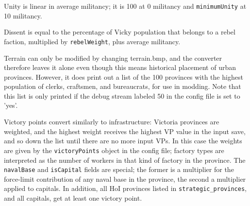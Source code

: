 \documentclass[12pt,ebook,oneside]{book}
\begin{document}
Unity is linear in average militancy; it is 100 at 0 militancy and
\texttt{minimumUnity} at 10 militancy. 

Dissent is equal to the percentage of Vicky population that belongs to a
rebel faction, multiplied by \texttt{rebelWeight}, plus average
militancy. 

Terrain can only be modified by changing terrain.bmp, and the
converter therefore leaves it alone even though this means historical
placement of urban provinces. However, it does print out a list of the
100 provinces with the highest population of clerks, craftsmen, and
bureaucrats, for use in modding. Note that this list is only printed
if the debug stream labeled 50 in the config file is set to 'yes'. 

Victory points convert similarly to infrastructure: Victoria provinces
are weighted, and the highest weight receives the highest VP value in
the input save, and so down the list until there are no more input
VPs. In this case the weights are given by the \texttt{victoryPoints}
object in the config file; factory types are interpreted as the number
of workers in that kind of factory in the province. The
\texttt{navalBase} and \texttt{isCapital} fields are special; the
former is a multiplier for the force-limit contribution of any naval
base in the province, the second a multiplier applied to capitals. In addition,
all HoI provinces listed in \texttt{strategic\_provinces}, and all
capitals, get at least one victory point. 
\end{document}
